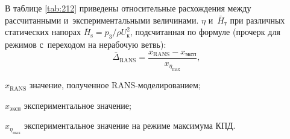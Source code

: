 В таблице \ref{tab:212} приведены относительные расхождения между рассчитанными и~экспериментальными величинами.
 \(\eta\) и~\(\bar{H}_\text{т}\) при различных статических напорах \(\bar{H}_\text{s}=p_3/\rho U_\text{к}^2\), подсчитанная по формуле (прочерк для режимов с~переходом на нерабочую ветвь):
\begin{equation}
	\bar{\Delta}_\text{RANS} = \frac{x_\text{RANS}-x_\text{эксп}}{x_{\eta_\text{max}}},
\end{equation}
\begin{eqexpl}[10 mm]
\item{\(x_\text{RANS}\)} значение, полученное RANS-моделированием;
\item{\(x_\text{эксп}\)} экспериментальное значение;
\item{\(x_{\eta_\text{max}}\)} экспериментальное значение на режиме максимума КПД.
\end{eqexpl}

